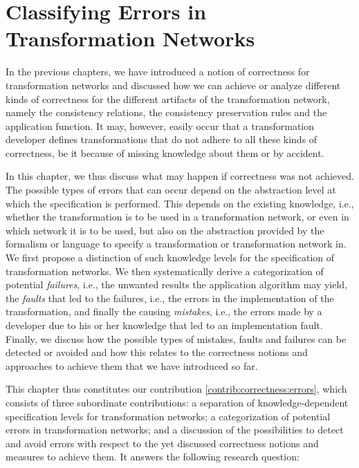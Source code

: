 \chapter{Classifying Errors in Transformation Networks 
}
\label{chap:errors}

In the previous chapters, we have introduced a notion of correctness for transformation networks and discussed how we can achieve or analyze different kinds of correctness for the different artifacts of the transformation network, namely the consistency relations, the consistency preservation rules and the application function.
It may, however, easily occur that a transformation developer defines transformations that do not adhere to all these kinds of correctness, be it because of missing knowledge about them or by accident.

In this chapter, we thus discuss what may happen if correctness was not achieved.
The possible types of errors that can occur depend on the abstraction level at which the specification is performed. 
This depends on the existing knowledge, i.e., whether the transformation is to be used in a transformation network, or even in which network it is to be used, but also on the abstraction provided by the formalism or language to specify a transformation or transformation network in.
We first propose a distinction of such knowledge levels for the specification of transformation networks.
We then systematically derive a categorization of potential \emph{failures}, i.e., the unwanted results the application algorithm may yield, the \emph{faults} that led to the failures, i.e., the errors in the implementation of the transformation, and finally the causing \emph{mistakes}, i.e., the errors made by a developer due to his or her knowledge that led to an implementation fault.
Finally, we discuss how the possible types of mistakes, faults and failures can be detected or avoided and how this relates to the correctness notions and approaches to achieve them that we have introduced so far.

This chapter thus constitutes our contribution \autoref{contrib:correctness:errors}, which consists of three subordinate contributions: a separation of knowledge-dependent specification levels for transformation networks; a categorization of potential errors in transformation networks; and a discussion of the possibilities to detect and avoid errors with respect to the yet discussed correctness notions and measures to achieve them.
It answers the following research question:


